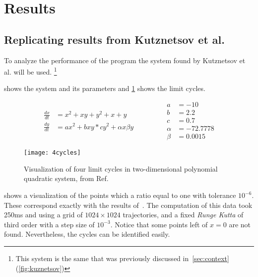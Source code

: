 
\section{Results}

\subsection{Replicating results from Kutznetsov et al.}

To analyze the performance of the program the system found by Kutznetsov et al.
\cite{kuznetsov_visualization_2013} will be used.
\footnote{This system is the same that was previously discussed
in~\cref{sec:context} (\cref{fig:kuznetsov})}

 shows the system and its parameters and \cref{fig:kuznetsov2}
shows the limit cycles.

\begin{equation}%
    \label{eq:kuznetsov}
    \begin{split}
        \frac{dx}{dt} &= x^2 + xy + y^2 + x + y\\
        \frac{dy}{dt} &= ax^2 + bxy * cy^2 + \alpha x \beta y
    \end{split}
    \qquad \qquad
    \begin{split}
        a &= -10\\
        b &= 2.2\\
        c &= 0.7\\
        \alpha &= -72.7778\\
        \beta &= 0.0015
    \end{split}
\end{equation}

\begin{figure}[H]
    \centering
    \texttt{[image: 4cycles]}
    \caption{Visualization of four limit cycles in two-dimensional polynomial quadratic system, from Ref.~\cite{kuznetsov_visualization_2013}
    }%
    \label{fig:kuznetsov2}
\end{figure}

 shows a visualization of the points which a ratio
equal to one with tolerance $10^{-6}$. These correspond exactly with the results
of~\cite{kuznetsov_visualization_2013}. The computation of this data took 250ms
and using a grid of $1024 \times 1024$ trajectories, and a fixed \emph{Runge Kutta}
of third order with a step size of $10^{-3}$. Notice that some points left of $x
= 0$ are not found. Nevertheless, the cycles can be identified easily.

